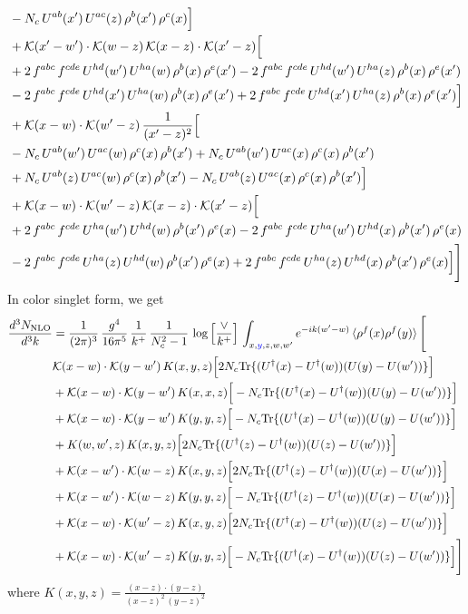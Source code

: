 \documentclass[9pt]{article}
\numberwithin{equation}{section}
\begin{document}
\begin{align}
& -N_{c}\,U^{ab}(x')\,U^{ac}(z)\,\rho^{b}(x')\,\rho^{c}(x)\Big]\notag\\
& +\mathcal{K}(x'-w')\cdot\mathcal{K}(w-z)\,\mathcal{K}(x-z)\cdot\mathcal{K}(x'-z)\Big[\notag\\
& +2\,f^{abc}\,f^{cde}\,U^{hd}(w')\,U^{ha}(w)\,\rho^{b}(x)\,\rho^{e}(x') -2\,f^{abc}\,f^{cde}\,U^{hd}(w')\,U^{ha}(z)\,\rho^{b}(x)\,\rho^{e}(x')\notag\\
& -2\,f^{abc}\,f^{cde}\,U^{hd}(x')\,U^{ha}(w)\,\rho^{b}(x)\,\rho^{e}(x') +2\,f^{abc}\,f^{cde}\,U^{hd}(x')\,U^{ha}(z)\,\rho^{b}(x)\,\rho^{e}(x')\Big]\notag\\
& +\mathcal{K}(x-w)\cdot\mathcal{K}(w'-z)\,\frac{1}{(x'-z)^{2}}\Big[\notag\\
& -N_{c}\,U^{ab}(w')\,U^{ac}(w)\,\rho^{c}(x)\,\rho^{b}(x') +N_{c}\,U^{ab}(w')\,U^{ac}(x)\,\rho^{c}(x)\,\rho^{b}(x')\notag\\
& +N_{c}\,U^{ab}(z)\,U^{ac}(w)\,\rho^{c}(x)\,\rho^{b}(x') -N_{c}\,U^{ab}(z)\,U^{ac}(x)\,\rho^{c}(x)\,\rho^{b}(x')\Big]\notag\\
& +\mathcal{K}(x-w)\cdot\mathcal{K}(w'-z)\,\mathcal{K}(x-z)\cdot\mathcal{K}(x'-z)\Big[\notag\\
& +2\,f^{abc}\,f^{cde}\,U^{ha}(w')\,U^{hd}(w)\,\rho^{b}(x')\,\rho^{e}(x) -2\,f^{abc}\,f^{cde}\,U^{ha}(w')\,U^{hd}(x)\,\rho^{b}(x')\,\rho^{e}(x)\notag\\
& -2\,f^{abc}\,f^{cde}\,U^{ha}(z)\,U^{hd}(w)\,\rho^{b}(x')\,\rho^{e}(x) +2\,f^{abc}\,f^{cde}\,U^{ha}(z)\,U^{hd}(x)\,\rho^{b}(x')\,\rho^{e}(x)\Big]\Bigg]
\end{align}
In color singlet form, we get
\begin{align}
\frac{d^{3}N_{\mathrm{NLO}}}{d^{3}k} & = \frac{1}{(2\pi)^{3}}\,\frac{g^{4}}{16\pi^{5}}\,\frac{1}{k^{+}}\,\frac{1}{N^{2}_{c}-1}\,\log\Big[\frac{\vee}{k^{+}}\Big]\,\int_{x,{\color{blue}y},z,w,w'}e^{-ik(w'-w)}\,\langle\rho^{f}(x)\rho^{f}(y) \rangle\,\Bigg[ \notag\\ & \mathcal K(x-w)\cdot\mathcal K(y-w')\,K(x,y,z)\Big[2 N_{c}{\rm Tr}\{(U^\dagger(x)-U^\dagger(w))(U(y)-U(w'))\}\Big]\notag\\
&+\mathcal K(x-w)\cdot\mathcal K(y-w')\,K(x,x,z)\Big[-N_{c}{\rm Tr}\{(U^\dagger(x)-U^\dagger(w))(U(y)-U(w'))\}\Big]\notag\\
&+\mathcal K(x-w)\cdot\mathcal K(y-w')\,K(y,y,z)\Big[-N_{c}{\rm Tr}\{(U^\dagger(x)-U^\dagger(w))(U(y)-U(w'))\}\Big]\notag\\
&+K(w,w',z)\,K(x,y,z)\Big[2 N_{c}{\rm Tr}\{(U^\dagger(z)-U^\dagger(w))(U(z)-U(w'))\}\Big]\notag\\
&+\mathcal K(x-w')\cdot\mathcal K(w-z)\,K(x,y,z)\Big[2 N_{c}{\rm Tr}\{(U^\dagger(z)-U^\dagger(w))(U(x)-U(w'))\}\Big]\notag\\
&+\mathcal K(x-w')\cdot\mathcal K(w-z)\,K(y,y,z)\Big[-N_{c}{\rm Tr}\{(U^\dagger(z)-U^\dagger(w))(U(x)-U(w'))\}\Big]\notag\\
&+\mathcal K(x-w)\cdot\mathcal K(w'-z)\,K(x,y,z)\Big[2 N_{c}{\rm Tr}\{(U^\dagger(x)-U^\dagger(w))(U(z)-U(w'))\}\Big]\notag\\
&+\mathcal K(x-w)\cdot\mathcal K(w'-z)\,K(y,y,z)\Big[-N_{c}{\rm Tr}\{(U^\dagger(x)-U^\dagger(w))(U(z)-U(w'))\}\Big]\Bigg]
\end{align}
where $K(x,y,z) = \frac{(x-z)\cdot (y-z)}{(x-z)^{2}\, (y-z)^{2}}$
\end{document}
